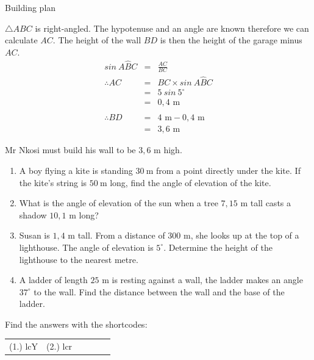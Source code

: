 \begin{wex}{Building plan}
{}{
$\triangle ABC$ is right-angled. The hypotenuse and an angle are known therefore we can calculate $AC$. The height of the wall $BD$ is then the height of the garage minus $AC$.
\begin{eqnarray*}
 sin~A\hat{B}C &=& \frac{AC}{BC} \\
\therefore AC &=& BC \times sin~A\hat{B}C\\
&=& 5~sin~5^{\circ}\\
&=& 0,4\mbox{ m}\\
\\
\therefore BD&=& 4\mbox{ m}-0,4\mbox{ m}\\
&=& 3,6\mbox{ m}
\end{eqnarray*}


Mr Nkosi must build his wall to be $3,6$ m high.
}
\end{wex}

\begin{exercises}{}
{
\begin{enumerate}[noitemsep, label=\textbf{\arabic*}. ] 

\item A boy flying a kite is standing $30~$m from a point directly under the kite. If the kite's string is $50~$m long, find the angle of elevation of the kite.
\item What is the angle of elevation of the sun when a tree $7,15$ m tall casts a shadow $10,1$ m long?
\item Susan is $1,4$ m tall. From a distance of $300$ m, she looks up at the top of a lighthouse. The angle of elevation is $5^{\circ}$. Determine the height of the lighthouse to the nearest metre.
\item A ladder of length $25$ m is resting against a wall, the ladder makes an angle $37^{\circ}$ to the wall. Find the distance between the wall and the base of the ladder. 

\end{enumerate}

\par {}Find the answers with the shortcodes:
\par \begin{tabular}[h]{cccccc}
(1.) lcY  &  (2.) lcr  & \end{tabular}
    
}
\end{exercises} 


